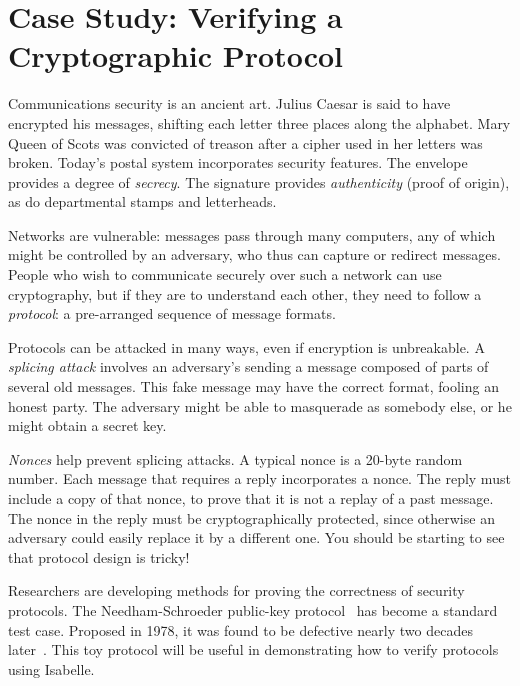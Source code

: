 \chapter{Case Study: Verifying a Cryptographic Protocol}
\label{chap:crypto}

\def\lbb{\mathopen{\{\kern-.30em|}}
\def\rbb{\mathclose{|\kern-.32em\}}}
\def\comp#1{\lbb#1\rbb}

Communications security is an ancient art.  Julius Caesar is said to have
encrypted his messages, shifting each letter three places along the
alphabet.  Mary Queen of Scots was convicted of treason after a cipher used
in her letters was broken.  Today's postal system
incorporates security features.  The envelope provides a degree of
\emph{secrecy}.  The signature provides \emph{authenticity} (proof of
origin), as do departmental stamps and letterheads.

Networks are vulnerable: messages pass through many computers, any of which
might be controlled by an adversary, who thus can capture or redirect
messages.  People who wish to communicate securely over such a network can
use cryptography, but if they are to understand each other, they need to
follow a
\emph{protocol}: a pre-arranged sequence of message formats. 

Protocols can be attacked in many ways, even if encryption is unbreakable. 
A \emph{splicing attack} involves an adversary's sending a message composed
of parts of several old messages.  This fake message may have the correct
format, fooling an honest party.  The adversary might be able to masquerade
as somebody else, or he might obtain a secret key.

\emph{Nonces} help prevent splicing attacks. A typical nonce is a 20-byte
random number. Each message that requires a reply incorporates a nonce. The
reply must include a copy of that nonce, to prove that it is not a replay of
a past message.  The nonce in the reply must be cryptographically
protected, since otherwise an adversary could easily replace it by a
different one. You should be starting to see that protocol design is
tricky!

Researchers are developing methods for proving the correctness of security
protocols.  The Needham-Schroeder public-key
protocol~\cite{needham-schroeder} has become a standard test case. 
Proposed in 1978, it was found to be defective nearly two decades
later~\cite{lowe-fdr}.  This toy protocol will be useful in demonstrating
how to verify protocols using Isabelle.


